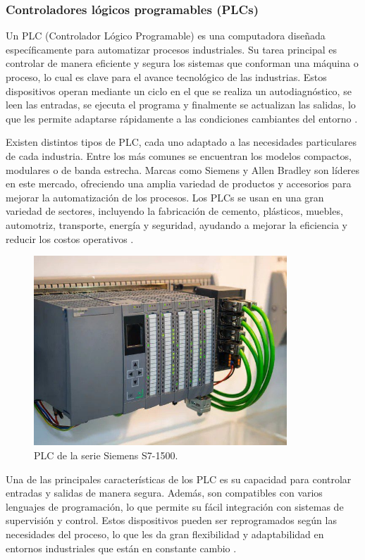 \subsubsection{Controladores lógicos programables (PLCs)}

Un PLC (Controlador Lógico Programable) es una computadora diseñada específicamente para automatizar procesos industriales. Su tarea principal es controlar de manera eficiente y segura los sistemas que conforman una máquina o proceso, lo cual es clave para el avance tecnológico de las industrias. Estos dispositivos operan mediante un ciclo en el que se realiza un autodiagnóstico, se leen las entradas, se ejecuta el programa y finalmente se actualizan las salidas, lo que les permite adaptarse rápidamente a las condiciones cambiantes del entorno  \cite{plc_info}.

Existen distintos tipos de PLC, cada uno adaptado a las necesidades particulares de cada industria. Entre los más comunes se encuentran los modelos compactos, modulares o de banda estrecha. Marcas como Siemens y Allen Bradley son líderes en este mercado, ofreciendo una amplia variedad de productos y accesorios para mejorar la automatización de los procesos. Los PLCs se usan en una gran variedad de sectores, incluyendo la fabricación de cemento, plásticos, muebles, automotriz, transporte, energía y seguridad, ayudando a mejorar la eficiencia y reducir los costos operativos  \cite{plc_info}.

\begin{figure} [h!]
  \begin{center}
    \includegraphics[width=9.5cm]{figs/info_plc}
  \end{center}
  \caption{\centering PLC de la serie Siemens S7-1500.}
  \label{fig:info_plc}
\end{figure} 

Una de las principales características de los PLC es su capacidad para controlar entradas y salidas de manera segura. Además, son compatibles con varios lenguajes de programación, lo que permite su fácil integración con sistemas de supervisión y control. Estos dispositivos pueden ser reprogramados según las necesidades del proceso, lo que les da gran flexibilidad y adaptabilidad en entornos industriales que están en constante cambio  \cite{plc_info}. \\


